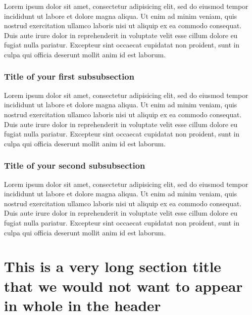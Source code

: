 Lorem ipsum dolor sit amet, consectetur adipisicing elit, sed do eiusmod tempor
incididunt ut labore et dolore magna aliqua. Ut enim ad minim veniam, quis
nostrud exercitation ullamco laboris nisi ut aliquip ex ea commodo consequat.
Duis aute irure dolor in reprehenderit in voluptate velit esse cillum dolore eu
fugiat nulla pariatur. Excepteur sint occaecat cupidatat non proident, sunt in
culpa qui officia deserunt mollit anim id est laborum.

\subsubsection{Title of your first subsubsection}

Lorem ipsum dolor sit amet, consectetur adipisicing elit, sed do eiusmod tempor
incididunt ut labore et dolore magna aliqua. Ut enim ad minim veniam, quis
nostrud exercitation ullamco laboris nisi ut aliquip ex ea commodo consequat.
Duis aute irure dolor in reprehenderit in voluptate velit esse cillum dolore eu
fugiat nulla pariatur. Excepteur sint occaecat cupidatat non proident, sunt in
culpa qui officia deserunt mollit anim id est laborum.

\subsubsection{Title of your second subsubsection}

Lorem ipsum dolor sit amet, consectetur adipisicing elit, sed do eiusmod tempor
incididunt ut labore et dolore magna aliqua. Ut enim ad minim veniam, quis
nostrud exercitation ullamco laboris nisi ut aliquip ex ea commodo consequat.
Duis aute irure dolor in reprehenderit in voluptate velit esse cillum dolore eu
fugiat nulla pariatur. Excepteur sint occaecat cupidatat non proident, sunt in
culpa qui officia deserunt mollit anim id est laborum.

\section[Short section title]{This is a very long section title that we would
not want to appear in whole in the header}

